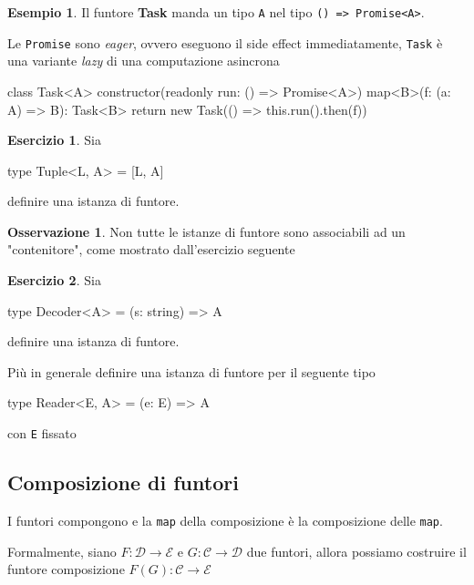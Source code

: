 \documentclass[12pt]{article}
\theoremstyle{definition}
\newtheorem{example}{Esempio}[section]
\newtheorem{exercise}{Esercizio}[section]
\newtheorem{observation}{Osservazione}[section]
\newenvironment{code}
  {\vspace{0.5cm} \VerbatimEnvironment\begin{typescriptcode}}
  {\end{typescriptcode} \vspace{0.2cm}}
\begin{document}
\begin{example}
Il funtore \textbf{Task} manda un tipo \texttt{A} nel tipo \texttt{() => Promise<A>}.

Le \texttt{Promise} sono \emph{eager}, ovvero eseguono il side effect immediatamente, \texttt{Task} è una variante \emph{lazy}
di una computazione asincrona

\begin{code}
class Task<A> {
  constructor(readonly run: () => Promise<A>) {}
  map<B>(f: (a: A) => B): Task<B> {
    return new Task(() => this.run().then(f))
  }
}
\end{code}
\end{example}

\begin{exercise}
Sia

\begin{code}
type Tuple<L, A> = [L, A]
\end{code}

definire una istanza di funtore.
\end{exercise}

\begin{observation}
Non tutte le istanze di funtore sono associabili ad un "contenitore", come mostrato dall'esercizio seguente
\end{observation}

\begin{exercise}
Sia

\begin{code}
type Decoder<A> = (s: string) => A
\end{code}

definire una istanza di funtore.

Più in generale definire una istanza di funtore per il seguente tipo

\begin{code}
type Reader<E, A> = (e: E) => A
\end{code}

con \texttt{E} fissato

\end{exercise}

\subsection{Composizione di funtori}

I funtori compongono e la \texttt{map} della composizione è la composizione delle \texttt{map}.

Formalmente, siano $F: \mathcal{D} \rightarrow \mathcal{E}$ e $G: \mathcal{C} \rightarrow \mathcal{D}$ due funtori,
allora possiamo costruire il funtore composizione $F(G): \mathcal{C} \rightarrow \mathcal{E}$
\end{document}
